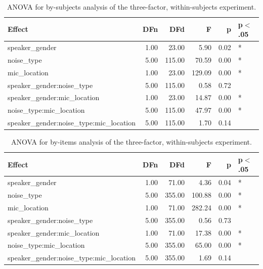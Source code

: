 \documentclass[dissertation,copyright]{uathesis}
\begin{document}
\begin{table}[ht]
\centering
\begin{tabular}{lrrrrl}
  \hline
Effect & DFn & DFd & F & p & p$<$.05 \\ 
  \hline
speaker\_gender & 1.00 & 23.00 & 5.90 & 0.02 & * \\ 
  noise\_type & 5.00 & 115.00 & 70.59 & 0.00 & * \\ 
  mic\_location & 1.00 & 23.00 & 129.09 & 0.00 & * \\ 
  speaker\_gender:noise\_type & 5.00 & 115.00 & 0.58 & 0.72 &  \\ 
  speaker\_gender:mic\_location & 1.00 & 23.00 & 14.87 & 0.00 & * \\ 
  noise\_type:mic\_location & 5.00 & 115.00 & 47.97 & 0.00 & * \\ 
  speaker\_gender:noise\_type:mic\_location & 5.00 & 115.00 & 1.70 & 0.14 &  \\ 
   \hline
\end{tabular}
\caption{ANOVA for by-subjects analysis of the three-factor, within-subjects experiment.} 
\label{tab:anova1_by_subj}
\end{table}
\begin{table}[ht]
\centering
\begin{tabular}{lrrrrl}
  \hline
Effect & DFn & DFd & F & p & p$<$.05 \\ 
  \hline
speaker\_gender & 1.00 & 71.00 & 4.36 & 0.04 & * \\ 
  noise\_type & 5.00 & 355.00 & 100.88 & 0.00 & * \\ 
  mic\_location & 1.00 & 71.00 & 282.24 & 0.00 & * \\ 
  speaker\_gender:noise\_type & 5.00 & 355.00 & 0.56 & 0.73 &  \\ 
  speaker\_gender:mic\_location & 1.00 & 71.00 & 17.38 & 0.00 & * \\ 
  noise\_type:mic\_location & 5.00 & 355.00 & 65.00 & 0.00 & * \\ 
  speaker\_gender:noise\_type:mic\_location & 5.00 & 355.00 & 1.69 & 0.14 &  \\ 
   \hline
\end{tabular}
\caption{ANOVA for by-items analysis of the three-factor, within-subjects experiment.} 
\label{tab:anova1_by_item}
\end{table}
\end{document}
